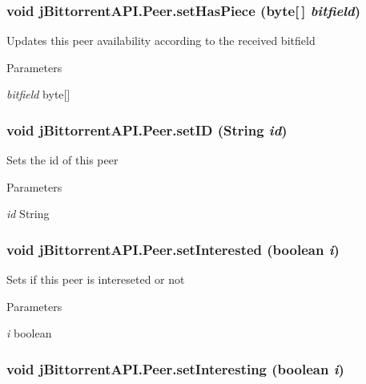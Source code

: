 \hypertarget{classj_bittorrent_a_p_i_1_1_peer_aa21bc505e928ff01a08472e68c2de02d}{
\subsubsection[{setHasPiece}]{\setlength{\rightskip}{0pt plus 5cm}void jBittorrentAPI.Peer.setHasPiece (byte\mbox{[}$\,$\mbox{]} {\em bitfield})}}
\label{classj_bittorrent_a_p_i_1_1_peer_aa21bc505e928ff01a08472e68c2de02d}
Updates this peer availability according to the received bitfield 
\begin{DoxyParams}{Parameters}
\item[{\em bitfield}]byte\mbox{[}\mbox{]} \end{DoxyParams}
\hypertarget{classj_bittorrent_a_p_i_1_1_peer_a3c44feb22505911dd1d168386c230918}{
\subsubsection[{setID}]{\setlength{\rightskip}{0pt plus 5cm}void jBittorrentAPI.Peer.setID (String {\em id})}}
\label{classj_bittorrent_a_p_i_1_1_peer_a3c44feb22505911dd1d168386c230918}
Sets the id of this peer 
\begin{DoxyParams}{Parameters}
\item[{\em id}]String \end{DoxyParams}
\hypertarget{classj_bittorrent_a_p_i_1_1_peer_aff5f908b9c7a9d252310619bb47d9148}{
\subsubsection[{setInterested}]{\setlength{\rightskip}{0pt plus 5cm}void jBittorrentAPI.Peer.setInterested (boolean {\em i})}}
\label{classj_bittorrent_a_p_i_1_1_peer_aff5f908b9c7a9d252310619bb47d9148}
Sets if this peer is intereseted or not 
\begin{DoxyParams}{Parameters}
\item[{\em i}]boolean \end{DoxyParams}
\hypertarget{classj_bittorrent_a_p_i_1_1_peer_afd6499773360e27d3c87c3a392014c46}{
\subsubsection[{setInteresting}]{\setlength{\rightskip}{0pt plus 5cm}void jBittorrentAPI.Peer.setInteresting (boolean {\em i})}}
